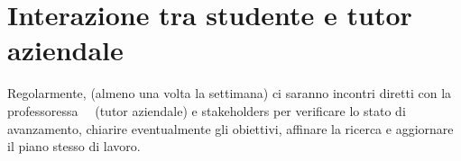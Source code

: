 \section*{Interazione tra studente e tutor aziendale}

Regolarmente, (almeno una volta la settimana) ci saranno incontri diretti con la professoressa \nomeTutorAziendale\ \cognomeTutorAziendale\ (tutor aziendale) e stakeholders per verificare lo stato di avanzamento, chiarire eventualmente gli obiettivi, affinare la ricerca e aggiornare il piano stesso di lavoro.